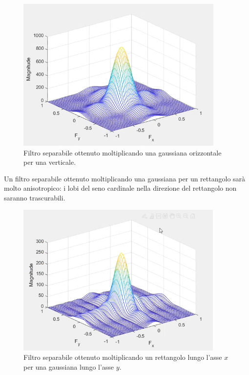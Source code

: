 \documentclass[a4paper,11pt]{article}
\begin{document}
\renewcommand{\thefigure}{6.5}
\begin{figure}[!h]
  \centering
    \includegraphics[scale=0.6]{images/6/gaussian_sep.png}
    \caption{Filtro separabile ottenuto moltiplicando una gaussiana orizzontale per una verticale.}
\end{figure}

Un filtro separabile ottenuto moltiplicando una gaussiana per un rettangolo sarà molto anisotropico: i lobi del seno cardinale nella direzione del rettangolo non saranno trascurabili.

\renewcommand{\thefigure}{6.6}
\begin{figure}[!h]
  \centering
    \includegraphics[scale=0.6]{images/6/gaussian_sep_rect.png}
    \caption{Filtro separabile ottenuto moltiplicando un rettangolo lungo l'asse $x$ per una gaussiana lungo l'asse $y$.}
\end{figure}
\end{document}
